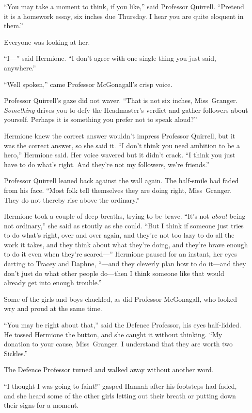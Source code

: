“You may take a moment to think, if you like,” said Professor Quirrell. “Pretend it is a homework essay, six inches due Thursday. I hear you are quite eloquent in them.”

Everyone was looking at her.

“I—” said Hermione. “I don’t agree with one single thing you just said, anywhere.”

“Well spoken,” came Professor McGonagall’s crisp voice.

Professor Quirrell’s gaze did not waver. “That is not six inches, Miss~Granger. \emph{Something} drives you to defy the Headmaster’s verdict and gather followers about yourself. Perhaps it is something you prefer not to speak aloud?”

Hermione knew the correct answer wouldn’t impress Professor Quirrell, but it was the correct answer, so she said it. “I don’t think you need ambition to be a hero,” Hermione said. Her voice wavered but it didn’t crack. “I think you just have to do what’s right. And they’re not my followers, we’re friends.”

Professor Quirrell leaned back against the wall again. The half-smile had faded from his face. “Most folk tell themselves they are doing right, Miss~Granger. They do not thereby rise above the ordinary.”

Hermione took a couple of deep breaths, trying to be brave. “It’s not \emph{about} being not ordinary,” she said as stoutly as she could. “But I think if someone just tries to do what’s right, over and over again, and they’re not too lazy to do all the work it takes, and they think about what they’re doing, and they’re brave enough to do it even when they’re scared—” Hermione paused for an instant, her eyes darting to Tracey and Daphne, “—and they cleverly plan how to do it—and they don’t just do what other people do—then I think someone like that would already get into enough trouble.”

Some of the girls and boys chuckled, as did Professor McGonagall, who looked wry and proud at the same time.

“You may be right about that,” said the Defence Professor, his eyes half-lidded. He tossed Hermione the button, and she caught it without thinking. “My donation to your cause, Miss~Granger. I understand that they are worth two Sickles.”

The Defence Professor turned and walked away without another word.

“I thought I was going to faint!” gasped Hannah after his footsteps had faded, and she heard some of the other girls letting out their breath or putting down their signs for a moment.

